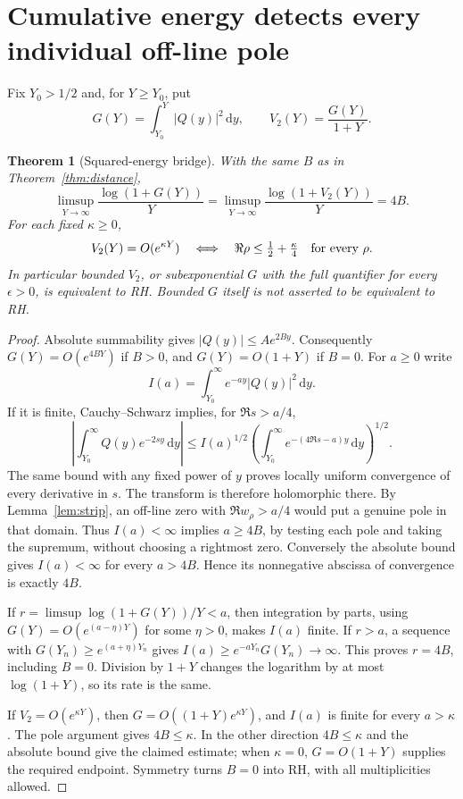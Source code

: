 \documentclass[11pt]{article}
\newtheorem{theorem}{Theorem}
\theoremstyle{remark}\newtheorem{remark}[theorem]{Remark}
\newcommand{\dd}{\,\mathrm d}
\begin{document}
\section{Cumulative energy detects every individual off-line pole}
Fix $Y_0>1/2$ and, for $Y\ge Y_0$, put
\[
 G(Y)=\int_{Y_0}^{Y}|Q(y)|^2\dd y,\qquad
 V_2(Y)=\frac{G(Y)}{1+Y}.
\]

\begin{theorem}[Squared-energy bridge]\label{thm:l2}
With the same $B$ as in Theorem~\ref{thm:distance},
\[
 \limsup_{Y\to\infty}\frac{\log(1+G(Y))}{Y}
 =\limsup_{Y\to\infty}\frac{\log(1+V_2(Y))}{Y}=4B.
\]
For each fixed $\kappa\ge0$,
\[
 V_2(Y)=O(e^{\kappa Y})
 \quad\Longleftrightarrow\quad
 \Re\rho\le\tfrac12+\tfrac\kappa4\quad\hbox{for every }\rho.
\]
In particular bounded $V_2$, or subexponential $G$ with the full
quantifier \emph{for every $\epsilon>0$}, is equivalent to RH.
Bounded $G$ itself is not asserted to be equivalent to RH.
\end{theorem}
\begin{proof}
Absolute summability gives $|Q(y)|\le A e^{2By}$.
Consequently $G(Y)=O(e^{4BY})$ if $B>0$, and $G(Y)=O(1+Y)$ if $B=0$.
For $a\ge0$ write
\[
 I(a)=\int_{Y_0}^{\infty}e^{-ay}|Q(y)|^2\dd y.
\]
If it is finite, Cauchy--Schwarz implies, for $\Re s>a/4$,
\[
 \left|\int_{Y_0}^{\infty}Q(y)e^{-2sy}\dd y\right|
 \le I(a)^{1/2}
 \left(\int_{Y_0}^{\infty}e^{-(4\Re s-a)y}\dd y\right)^{1/2}.
\]
The same bound with any fixed power of $y$ proves locally uniform
convergence of every derivative in $s$. The transform is therefore
holomorphic there. By Lemma~\ref{lem:strip}, an off-line zero with
$\Re w_\rho>a/4$ would put a genuine pole in that domain.
Thus $I(a)<\infty$ implies $a\ge4B$, by testing each pole and
taking the supremum, without choosing a rightmost zero.
Conversely the absolute bound gives $I(a)<\infty$ for every $a>4B$.
Hence its nonnegative abscissa of convergence is exactly $4B$.

If $r=\limsup\log(1+G(Y))/Y<a$, then integration by parts, using
$G(Y)=O(e^{(a-\eta)Y})$ for some $\eta>0$, makes $I(a)$ finite.
If $r>a$, a sequence with $G(Y_n)\ge e^{(a+\eta)Y_n}$ gives
$I(a)\ge e^{-aY_n}G(Y_n)\to\infty$.
This proves $r=4B$, including $B=0$. Division by $1+Y$ changes
the logarithm by at most $\log(1+Y)$, so its rate is the same.

If $V_2=O(e^{\kappa Y})$, then $G=O((1+Y)e^{\kappa Y})$,
and $I(a)$ is finite for every $a>\kappa$. The pole argument gives
$4B\le\kappa$. In the other direction $4B\le\kappa$ and the
absolute bound give the claimed estimate; when $\kappa=0$,
$G=O(1+Y)$ supplies the required endpoint. Symmetry turns
$B=0$ into RH, with all multiplicities allowed.
\end{proof}
\end{document}

